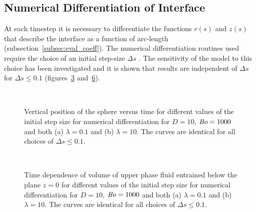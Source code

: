 \documentclass[12pt]{article}
\newcommand\Bo{\mbox{\textit{Bo}}}  %
\begin{document}
\subsection{Numerical Differentiation of Interface}
\label{subsec:num_diff}

At each timestep it is necessary to differentiate the functions $r(s)$ and $z(s)$ that describe the interface as a function of arc-length (subsection~\ref{subsec:eval_coeff}). The numerical differentiation routines used require the choice of an initial step-size $\Delta s$ \citep{Press07}. The sensitivity of the model to this choice has been investigated and it is shown that results are independent of $\Delta s$ for $\Delta s \leq 0.1$ (figures~\ref{fig:diff_test_pos} and~\ref{fig:diff_test_vol}).
    \begin{figure}
      \centering
      \begin{subfigure}[b]{0.5\textwidth}
        \resizebox{\textwidth}{!}{\Large }
        \caption{}
        \label{fig:diff_test_pos_tail}
      \end{subfigure}%
      ~
      \begin{subfigure}[b]{0.5\textwidth}
        \resizebox{\textwidth}{!}{\Large }
        \caption{}
        \label{fig:diff_test_pos_film}
      \end{subfigure}
      \caption{Vertical position of the sphere versus time for different values of the initial step size for numerical differentiation for $D = 10$, $\Bo = 1000$ and both (a) $\lambda = 0.1$ and (b) $\lambda = 10$. The curves are identical for all choices of $\Delta s \leq 0.1$.}\label{fig:diff_test_pos}
    \end{figure}


    \begin{figure}
      \centering
      \begin{subfigure}[b]{0.5\textwidth}
        \resizebox{\textwidth}{!}{\Large }
        \caption{}
        \label{fig:diff_test_vol_tail}
      \end{subfigure}%
      ~
      \begin{subfigure}[b]{0.5\textwidth}
        \resizebox{\textwidth}{!}{\Large }
        \caption{}
        \label{fig:diff_test_vol_film}
      \end{subfigure}
      \caption{Time dependence of volume of upper phase fluid entrained below the plane $z = 0$ for different values of the initial step size for numerical differentiation for $D = 10$, $\Bo = 1000$ and both (a) $\lambda = 0.1$ and (b) $\lambda = 10$. The curves are identical for all choices of $\Delta s \leq 0.1$.}\label{fig:diff_test_vol}
    \end{figure}
\end{document}
